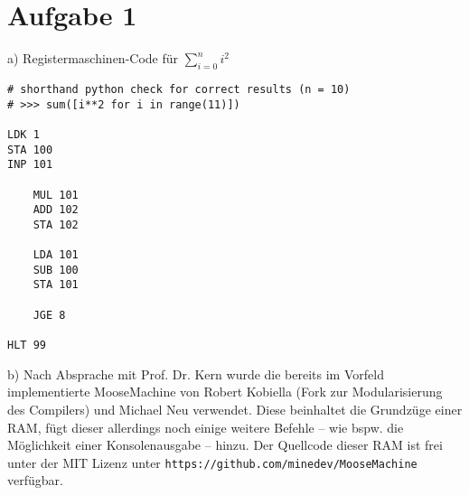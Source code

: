 \section*{Aufgabe 1}
	a) Registermaschinen-Code für $\sum_{i=0}^n i^2$\\
    \begin{verbatim}
# shorthand python check for correct results (n = 10)
# >>> sum([i**2 for i in range(11)])

LDK 1
STA 100
INP 101

    MUL 101
    ADD 102
    STA 102
    
    LDA 101
    SUB 100
    STA 101

    JGE 8

HLT 99
    \end{verbatim}
    
    b) Nach Absprache mit Prof. Dr. Kern wurde die bereits im Vorfeld implementierte MooseMachine von Robert Kobiella (Fork zur Modularisierung des Compilers) und Michael Neu verwendet. Diese beinhaltet die Grundzüge einer RAM, fügt dieser allerdings noch einige weitere Befehle -- wie bspw. die Möglichkeit einer Konsolenausgabe -- hinzu. Der Quellcode dieser RAM ist frei unter der MIT Lizenz unter \texttt{https://github.com/minedev/MooseMachine} verfügbar.